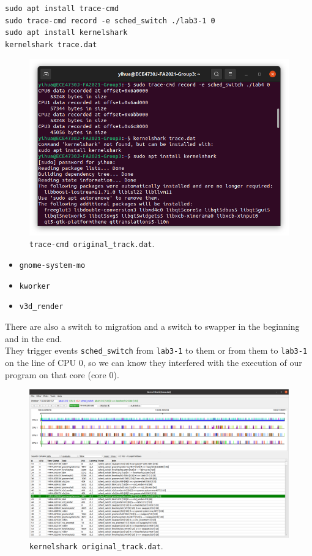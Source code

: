 \documentclass[a4paper]{article}
\begin{document}
\begin{verbatim}
sudo apt install trace-cmd
sudo trace-cmd record -e sched_switch ./lab3-1 0
sudo apt install kernelshark
kernelshark trace.dat
\end{verbatim}
\begin{figure}[H]
    \centering
    \includegraphics[width=1\textwidth]{2.png}
    \caption{\texttt{trace-cmd original\_track.dat}.}
\end{figure}
\begin{itemize}
    \item \texttt{gnome-system-mo}
    \item \texttt{kworker}
    \item \texttt{v3d\_render}
\end{itemize}
There are also a switch to migration and a switch to swapper in the beginning and in the end.\\
They trigger events \texttt{sched\_switch} from \texttt{lab3-1} to them or from them to \texttt{lab3-1} on the line of CPU 0, so we can know they interfered with the execution of our program on that core (core 0).
\begin{figure}[H]
    \centering
    \includegraphics[width=1\textwidth]{3.png}
    \caption{\texttt{kernelshark original\_track.dat}.}
\end{figure}
\end{document}
